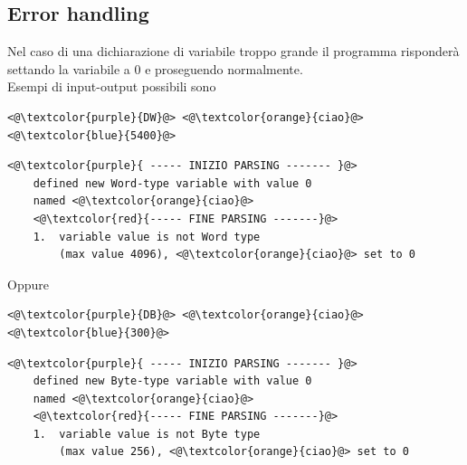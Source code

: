 \subsection{Error handling}
Nel caso di una dichiarazione di variabile troppo grande il programma risponderà settando la variabile a 0 e proseguendo normalmente.
\\Esempi di input-output possibili sono
\begin{lstlisting}[caption=input]
    <@\textcolor{purple}{DW}@> <@\textcolor{orange}{ciao}@> <@\textcolor{blue}{5400}@>
\end{lstlisting}
\begin{lstlisting}[caption=output]
    <@\textcolor{purple}{ ----- INIZIO PARSING ------- }@>
    defined new Word-type variable with value 0 
    named <@\textcolor{orange}{ciao}@>
    <@\textcolor{red}{----- FINE PARSING -------}@>
    1.	variable value is not Word type
        (max value 4096), <@\textcolor{orange}{ciao}@> set to 0
\end{lstlisting}
Oppure 
\begin{lstlisting}[caption=input]
    <@\textcolor{purple}{DB}@> <@\textcolor{orange}{ciao}@> <@\textcolor{blue}{300}@>
\end{lstlisting}
\begin{lstlisting}[caption=output]
    <@\textcolor{purple}{ ----- INIZIO PARSING ------- }@>
    defined new Byte-type variable with value 0 
    named <@\textcolor{orange}{ciao}@>
    <@\textcolor{red}{----- FINE PARSING -------}@>
    1.	variable value is not Byte type
        (max value 256), <@\textcolor{orange}{ciao}@> set to 0
\end{lstlisting}








